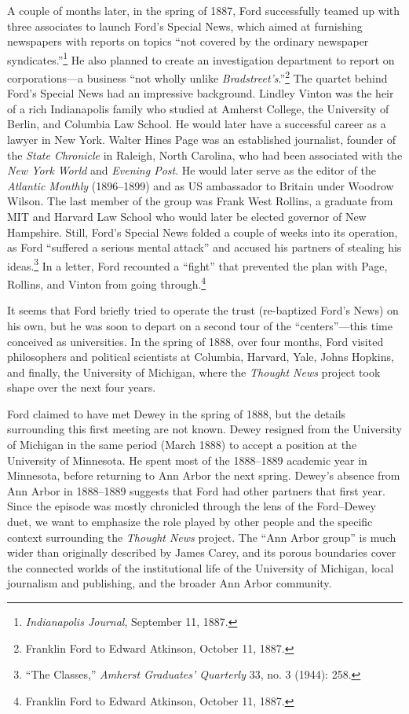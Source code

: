 \documentclass[twoside,symmetric,nobib,justified]{tufte-book}
\begin{document}
A couple of months later, in the spring of 1887, Ford successfully
teamed up with three associates to launch Ford's Special News, which
aimed at furnishing newspapers with reports on topics ``not covered by
the ordinary newspaper syndicates.''\footnote{\emph{Indianapolis
  Journal}, September 11, 1887.} He also planned to create an
investigation department to report on corporations---a business ``not
wholly unlike \emph{Bradstreet's}.''\footnote{Franklin Ford to Edward
  Atkinson, October 11, 1887.} The quartet behind Ford's Special News
had an impressive background. Lindley Vinton was the heir of a rich
Indianapolis family who studied at Amherst College, the University of
Berlin, and Columbia Law School. He would later have a successful career
as a lawyer in New York. Walter Hines Page was an established
journalist, founder of the \emph{State Chronicle} in Raleigh, North
Carolina, who had been associated with the \emph{New York} \emph{World}
and \emph{Evening Post}. He would later serve as the editor of the
\emph{Atlantic Monthly} (1896--1899) and as US ambassador to Britain
under Woodrow Wilson. The last member of the group was Frank West
Rollins, a graduate from MIT and Harvard Law School who would later be
elected governor of New Hampshire. Still, Ford's Special News folded a
couple of weeks into its operation, as Ford ``suffered a serious mental
attack'' and accused his partners of stealing his ideas.\footnote{``The
  Classes,'' \emph{Amherst Graduates' Quarterly} 33, no. 3 (1944): 258.}
In a letter, Ford recounted a ``fight'' that prevented the plan with
Page, Rollins, and Vinton from going through.\footnote{Franklin Ford to
  Edward Atkinson, October 11, 1887.}

It seems that Ford briefly tried to operate the trust (re-baptized
Ford's News) on his own, but he was soon to depart on a second tour of
the ``centers''---this time conceived as universities. In the spring of
1888, over four months, Ford visited philosophers and political
scientists at Columbia, Harvard, Yale, Johns Hopkins, and finally, the
University of Michigan, where the \emph{Thought News} project took shape
over the next four years.

Ford claimed to have met Dewey in the spring of 1888, but the details
surrounding this first meeting are not known. Dewey resigned from the
University of Michigan in the same period (March 1888) to accept a
position at the University of Minnesota. He spent most of the 1888--1889
academic year in Minnesota, before returning to Ann Arbor the next
spring. Dewey's absence from Ann Arbor in 1888--1889 suggests that Ford
had other partners that first year. Since the episode was mostly
chronicled through the lens of the Ford­--Dewey duet, we want to
emphasize the role played by other people and the specific context
surrounding the \emph{Thought News} project. The ``Ann Arbor group'' is
much wider than originally described by James Carey, and its porous
boundaries cover the connected worlds of the institutional life of the
University of Michigan, local journalism and publishing, and the broader
Ann Arbor community.
\end{document}
